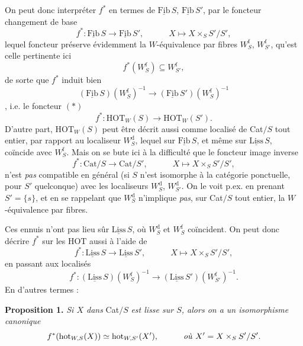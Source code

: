 \documentclass[11pt]{article}
\newcommand{\msp}[1]{\marginpar{\footnotesize [#1]}}
\newcommand{\Fib}{\underline{\mathrm{Fib}}\,}
\newcommand{\Liss}{\underline{\mathrm{Liss}}}
\newcommand{\HOT}{\mathrm{HOT}}
\newcommand{\hot}{\mathrm{hot}}
\newcommand{\Cat}{\mathrm{Cat}}
\begin{document}
On peut donc interpréter $f^*$ en termes de $\Fib S$, $\Fib S'$, par le foncteur changement de base
\[f^* : \Fib S \longrightarrow \Fib S', \qquad\quad X \longmapsto X \times_S S'/S',\]
lequel foncteur préserve évidemment la $W$-équivalence par fibres $W_S^{\mathrm{f}}$, $W_{S'}^{\mathrm{f}}$, qu'est celle pertinente ici
\[f^*(W_S^{\mathrm{f}}) \subseteq W_{S'}^{\mathrm{f}},\]
de sorte que $f^*$ induit bien
\[(\Fib S)(W_S^{\mathrm{f}})^{-1} \longrightarrow (\Fib S')(W_S^{\mathrm{f}})^{-1}\]
,
\msp{page 118}
i.e. le foncteur $(*)$
\[f^* : \HOT_W(S) \longrightarrow \HOT_W(S').\]
D'autre part, $\HOT_W(S)$ peut être décrit aussi comme localisé de Cat$/S$ tout entier, par rapport au localiseur $W_S^{\mathrm{d}}$, lequel sur $\Fib S$, et même sur $\Liss\,S$, coïncide avec $W_S^{\mathrm{f}}$. Mais on se bute ici à la difficulté que le foncteur image inverse
\[f^* : \Cat/S \longrightarrow \Cat/S', \qquad\quad X \longmapsto X \times_S S'/S',\]
n'est \textit{pas} compatible en général (si $S$ n'est isomorphe à la catégorie ponctuelle, pour $S'$ quelconque) avec les localiseurs $W_S^{\mathrm{d}}$, $W_{S'}^{\mathrm{d}}$. On le voit p.ex. en prenant $S' = \{s\}$, et en se rappelant que $W_S^{\mathrm{d}}$ n'implique \textit{pas}, sur Cat$/S$ tout entier, la $W$-équivalence par fibres.

Ces ennuis n'ont pas lieu sûr $\Liss\,S$, où $W_S^{\mathrm{d}}$ et $W_S^{\mathrm{f}}$ coïncident. On peut donc décrire $f^*$ sur les HOT aussi à l'aide de %
\[f^* : \Liss\,S \longrightarrow \Liss\,S', \qquad\quad X \longmapsto X \times_S S'/S',\]
en passant aux localisés
\[f^* : (\Liss\,S)(W_S^{\mathrm{f}})^{-1} \longrightarrow (\Liss\,S')(W_{S'}^{\mathrm{f}})^{-1}.\]
En d'autres termes :

\textbf{Proposition 1.} \textit{Si $X$ dans} Cat$/S$ \textit{est lisse sur $S$, alors on a un isomorphisme canonique}
\[f^*(\hot_{W,S}(X)) \simeq \hot_{W,S'}(X'), \qquad\quad \text{\textit{où} } X' = X \times_S S'/S'.\]
\end{document}
